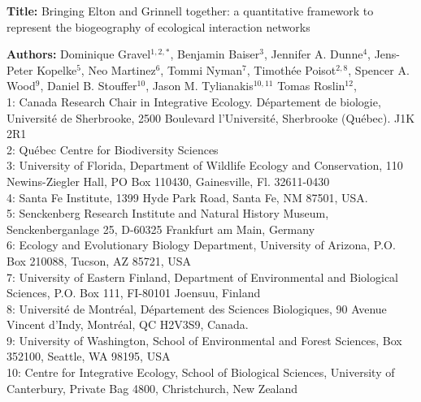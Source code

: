 \documentclass[12pt]{article}
\begin{document}
\linenumbers
\modulolinenumbers[1]

\textbf{Title:} Bringing Elton and Grinnell together: a quantitative framework to represent the biogeography of ecological interaction networks

\textbf{Authors:} Dominique Gravel$^{1,2,*}$, Benjamin Baiser$^{3}$, Jennifer A. Dunne$^{4}$, Jens-Peter Kopelke$^{5}$, Neo
Martinez$^{6}$, Tommi Nyman$^{7}$, Timoth\'ee Poisot$^{2,8}$, Spencer A. Wood$^{9}$, Daniel B. Stouffer$^{10}$, Jason M. Tylianakis$^{10,11}$ Tomas Roslin$^{12}$,\\

1: Canada Research Chair in Integrative Ecology. D\'epartement de
biologie, Universit\'e de Sherbrooke, 2500 Boulevard l'Universit\'e,
Sherbrooke (Québec). J1K 2R1\\

2: Qu\'ebec Centre for Biodiversity Sciences\\

3: University of Florida, Department of Wildlife Ecology and Conservation, 110 Newins-Ziegler Hall, PO Box 110430, Gainesville, Fl. 32611-0430 \\

4: Santa Fe Institute, 1399 Hyde Park Road, Santa Fe, NM 87501, USA.\\

5: Senckenberg Research Institute and Natural History Museum, Senckenberganlage 25, D-60325 Frankfurt am Main, Germany\\

6: Ecology and Evolutionary Biology Department, University of Arizona, P.O. Box 210088, Tucson, AZ 85721, USA\\

7: University of Eastern Finland, Department of Environmental and Biological Sciences, P.O. Box 111, FI-80101 Joensuu, Finland\\

8: Université de Montréal, Département des Sciences Biologiques, 90 Avenue Vincent d’Indy, Montréal, QC H2V3S9, Canada.\\

9: University of Washington, School of Environmental and Forest Sciences,
Box 352100, Seattle, WA 98195, USA\\

10: Centre for Integrative Ecology, School of Biological Sciences, University of Canterbury, Private Bag 4800, Christchurch, New Zealand\\
\end{document}
